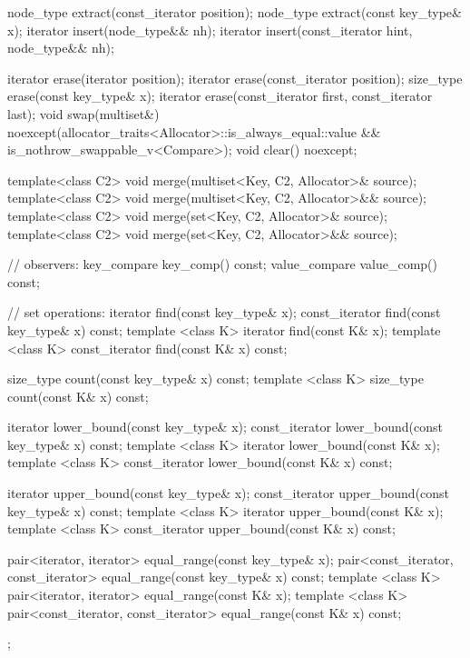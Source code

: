\begin{codeblock}
{{    node_type extract(const_iterator position);
    node_type extract(const key_type& x);
    iterator insert(node_type&& nh);
    iterator insert(const_iterator hint, node_type&& nh);

    iterator  erase(iterator position);
    iterator  erase(const_iterator position);
    size_type erase(const key_type& x);
    iterator  erase(const_iterator first, const_iterator last);
    void      swap(multiset&)
      noexcept(allocator_traits<Allocator>::is_always_equal::value &&
               is_nothrow_swappable_v<Compare>);
    void      clear() noexcept;

    template<class C2>
      void merge(multiset<Key, C2, Allocator>& source);
    template<class C2>
      void merge(multiset<Key, C2, Allocator>&& source);
    template<class C2>
      void merge(set<Key, C2, Allocator>& source);
    template<class C2>
      void merge(set<Key, C2, Allocator>&& source);

    // observers:
    key_compare key_comp() const;
    value_compare value_comp() const;

    // set operations:
    iterator       find(const key_type& x);
    const_iterator find(const key_type& x) const;
    template <class K> iterator       find(const K& x);
    template <class K> const_iterator find(const K& x) const;

    size_type      count(const key_type& x) const;
    template <class K> size_type count(const K& x) const;

    iterator       lower_bound(const key_type& x);
    const_iterator lower_bound(const key_type& x) const;
    template <class K> iterator       lower_bound(const K& x);
    template <class K> const_iterator lower_bound(const K& x) const;

    iterator       upper_bound(const key_type& x);
    const_iterator upper_bound(const key_type& x) const;
    template <class K> iterator       upper_bound(const K& x);
    template <class K> const_iterator upper_bound(const K& x) const;

    pair<iterator, iterator>               equal_range(const key_type& x);
    pair<const_iterator, const_iterator>   equal_range(const key_type& x) const;
    template <class K>
      pair<iterator, iterator>             equal_range(const K& x);
    template <class K>
      pair<const_iterator, const_iterator> equal_range(const K& x) const;
  };

}
\end{codeblock}
